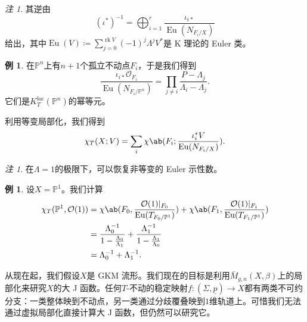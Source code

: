 \documentclass{amsart}
\theoremstyle{definition}
\newtheorem{exm}[thm]{例}
\theoremstyle{remark}
\newtheorem{rmk}[thm]{注}
\theoremstyle{plain}
\theoremstyle{definition}
\theoremstyle{remark}
\renewcommand{\P}{\mathbb{P}}
\newcommand{\mc}[1]{\mathcal{#1}}
\newcommand{\mr}[1]{\mathrm{#1}}
\newcommand{\on}[1]{\operatorname{#1}}
\newcommand{\ul}[1]{\underline{#1}}
\newcommand{\1}{\mathbf{1}}
\newcommand{\2}{\mathbf{2}}
\newcommand{\3}{\mathbf{3}}
\newcommand{\loc}{\mr{loc}}
\begin{document}
\begin{rmk}
    其逆由
    \[ (\iota^*)^{-1} = \bigoplus_{i=1}^r \frac{\iota_{i*}}{\on{Eu}(N_{F_i/X})} \]
    给出，其中\(\on{Eu}(V) \coloneqq \sum_{j = 0}^{\on{rk} V} (-1)^j \Lambda^j V^*\)是 K 理论的 Euler 类。
\end{rmk}

\begin{exm}
    在\(\P^n\)上有\(n+1\)个孤立不动点\(F_i\)，于是我们得到
    \[ \frac{\iota_{i*} \mc{O}_{F_i}}{\on{Eu}(N_{F_i/\P^n})} = \prod_{j \neq i} \frac{P - \Lambda_j}{\Lambda_i - \Lambda_j}. \]
    它们是\(K_T^{\loc}(\P^n)\)的幂等元。
\end{exm}

利用等变局部化，我们得到
\[ \chi_T(X; V) = \sum_i \chi\ab(F_i; \frac{\iota_i^* V}{\on{Eu}(N_{F_i/X})}). \]

\begin{rmk}
    在\(\Lambda = 1\)的极限下，可以恢复非等变的 Euler 示性数。
\end{rmk}

\begin{exm}
    设\(X = \P^1\)。我们计算
    \begin{align*}
        \chi_T(\P^1, \mc{O}(1)) &= \chi\ab(F_0, \frac{\mc{O}(1)|_{F_0}}{\on{Eu}(T_{F_0/\P^1})}) + \chi\ab(F_1, \frac{\mc{O}(1)|_{F_1}}{\on{Eu}(T_{F_1/\P^1})}) \\
        &= \frac{\Lambda_0^{-1}}{1 - \frac{\Lambda_0}{\Lambda_1}} + \frac{\Lambda_1^{-1}}{1 - \frac{\Lambda_1}{\Lambda_0}} \\
        &= \Lambda_0^{-1} + \Lambda_1^{-1}. 
    \end{align*}
\end{exm}

从现在起，我们假设\(X\)是 GKM 流形。我们现在的目标是利用\(\bar{M}_{g,n}(X, \beta)\)上的局部化来研究\(X\)的大 J 函数。任何\(T\)-不动的稳定映射\(f \colon (\Sigma, \ul{p}) \to X\)都有两类不可约分支：一类整体映到不动点，另一类通过分歧覆叠映到\(1\)维轨道上。可惜我们无法通过虚拟局部化直接计算大 J 函数，但仍然可以研究它。
\end{document}
